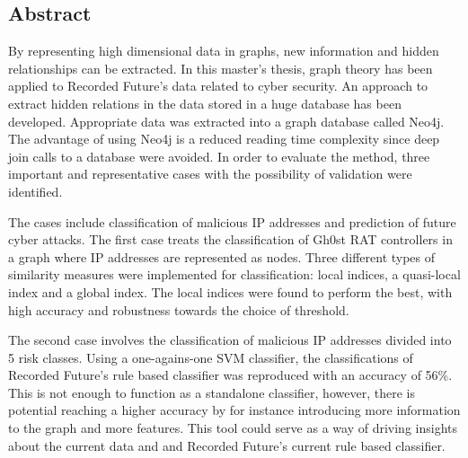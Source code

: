 
\noindent
\begin{comment}
\thesistitle\\
\thesissubtitle\\
\whatthisis\\
\\
\large{%
    Henrik Adolfsson\\
	Josephine Cuellar Andersson\\
}\\
\\
\large{%
	\whereandwhen
}
\vfill
\end{comment}

\begin{center}
    \section*{Abstract}
\end{center}

By representing high dimensional data in graphs, new information and hidden relationships can be extracted. In this master's thesis, graph theory has been applied to Recorded Future's data related to cyber security. An approach to extract hidden relations in the data stored in a huge database has been developed. Appropriate data was extracted into a graph database called Neo4j. The advantage of using Neo4j is a reduced reading time complexity since deep join calls to a database were avoided. In order to evaluate the method, three important and representative cases with the possibility of validation were identified. 

The cases include classification of malicious IP addresses and prediction of future cyber attacks. The first case treats the classification of Gh0st RAT controllers in a graph where IP addresses are represented as nodes. Three different types of similarity measures were implemented for classification: local indices, a quasi-local index and a global index. The local indices were found to perform the best, with high accuracy and robustness towards the choice of threshold.

The second case involves the classification of malicious IP addresses divided into 5 risk classes. Using a one-agains-one SVM classifier, the classifications of Recorded Future's rule based classifier was reproduced with an accuracy of 56\%. This is not enough to function as a standalone classifier, however, there is potential reaching a higher accuracy by for instance introducing more information to the graph and more features. This tool could serve as a way of driving insights about the current data and and Recorded Future's current rule based classifier.

